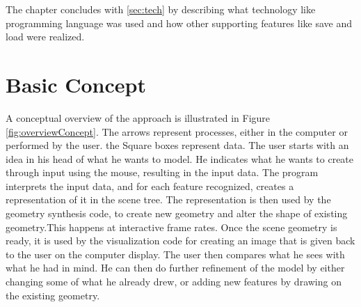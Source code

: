 \documentclass[a4paper,12pt]{report}
\newcommand{\secref}[1]{\autoref{#1}}
\begin{document}
The chapter concludes with \secref{sec:tech} by describing what technology like programming language was used and how other supporting features like save and load were realized.

\pagebreak

\section{Basic Concept}
\label{sec:concept}

 A conceptual overview of the approach is illustrated in Figure \ref{fig:overviewConcept}. The arrows represent processes, either in the computer or performed by the user. the Square boxes represent data. The user starts with an idea in his head of what he wants to model. He indicates what he wants to create through input using the mouse, resulting in the input data. The program interprets the input data, and for each feature recognized, creates a representation of it in the scene tree. The representation is then used by the geometry synthesis code, to create new geometry and alter the shape of existing geometry.This happens at interactive frame rates. Once the scene geometry is ready, it is used by the visualization code for creating an image that is given back to the user on the computer display. The user then compares what he sees with what he had in mind. He can then do further refinement of the model by either changing some of what he already drew, or adding new features by drawing on the existing geometry.
\end{document}
